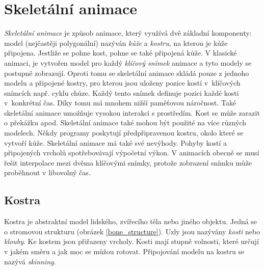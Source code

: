 \chapter{Skeletální animace}
\textit{Skeletální animace} je způsob animace, který využívá dvě základní komponenty: model (nejčastěji polygonální) nazýván \textit{kůže} a \textit{kostru}, na kterou je kůže připojena. Jestliže se pohne kost, pohne se také připojená kůže. V klasické animaci, je vytvořen model pro každý \textit{klíčový snímek} animace a tyto modely se postupně zobrazují. Oproti tomu se skeletální animace skládá pouze z jednoho modelu a připojené kostry, pro kterou jsou uloženy pozice kostí v~klíčových snímcích např. cyklu chůze. Každý tento snímek definuje pozici každé kosti v~konkrétní čas. Díky tomu má mnohem nižší paměťovou náročnost. Také skeletální animace umožňuje vysokou interakci s prostředím. Kost se může zarazit o překážku apod. Skeletální animace také mohou být použité na více různých modelech. Někdy programy poskytují předpřipravenou kostru, okolo které se vytvoří kůže. Skeletální animace má také své nevýhody. Pohyby kostí a připojených vrcholů spotřebovávají výpočetní výkon. V animacích obecně se musí řešit interpolace mezi dvěma klíčovými snímky, protože zobrazení snímku může proběhnout v libovolný čas.
\section{Kostra}
Kostra je abstraktní model lidského, zvířecího těla nebo jiného objektu. Jedná se o stromovou strukturu (obrázek \ref{bone_structure}). Uzly jsou nazývány \textit{kosti} nebo \textit{klouby}. Ke kostem jsou přiřazeny vrcholy. Kosti mají stupně volnosti, které určují v jakém směru a jak moc se můžou rotovat. Připojování modelu na kostru se nazývá \textit{skinning}.

